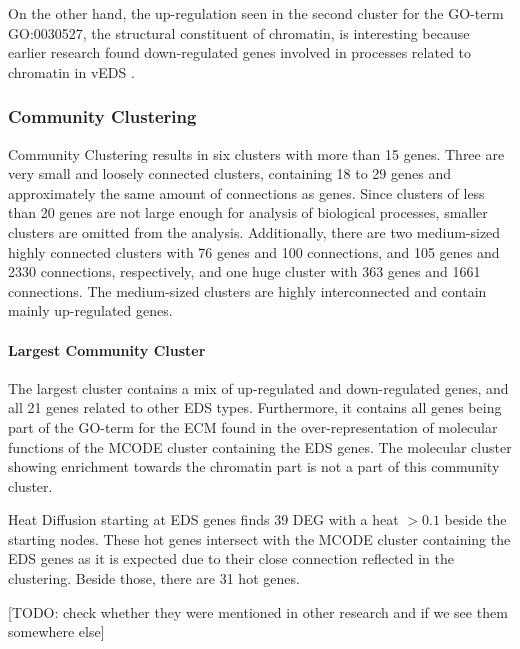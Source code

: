 On the other hand, the up-regulation seen in the second cluster for the GO-term GO:0030527, the structural constituent of chromatin, is interesting because earlier research found down-regulated genes involved in processes related to chromatin in vEDS \cite{Chiarelli2018}.


\subsubsection{Community Clustering}

Community Clustering results in six clusters with more than 15 genes. Three are very small and loosely connected clusters, containing 18 to 29 genes and approximately the same amount of connections as genes. Since clusters of less than 20 genes are not large enough for analysis of biological processes, smaller clusters are omitted from the analysis. Additionally, there are two medium-sized highly connected clusters with 76 genes and 100 connections, and 105 genes and 2330 connections, respectively, and one huge cluster with 363 genes and 1661 connections. The medium-sized clusters are highly interconnected and contain mainly up-regulated genes.

\paragraph{Largest Community Cluster}

The largest cluster contains a mix of up-regulated and down-regulated genes, and all 21 genes related to other EDS types. Furthermore, it contains all  genes being part of the GO-term for the ECM found in the over-representation of molecular functions of the MCODE cluster containing the EDS genes. The molecular cluster showing enrichment towards the chromatin part is not a part of this community cluster.

Heat Diffusion starting at EDS genes finds 39 DEG with a heat $> 0.1$ beside the starting nodes. These hot genes intersect with the MCODE cluster containing the EDS genes as it is expected due to their close connection reflected in the clustering. Beside those, there are 31 hot genes.


[TODO: check whether they were mentioned in other research and if we see them somewhere else]

